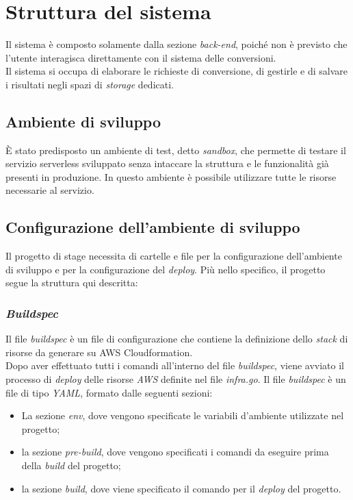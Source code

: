 \newpage
\section{Struttura del sistema}

Il sistema è composto solamente dalla sezione \emph{back-end}, poiché
non è previsto che l'utente interagisca direttamente con il sistema delle
conversioni. \\
Il sistema si occupa di elaborare le richieste di conversione, di gestirle e di
salvare i risultati negli spazi di \emph{storage} dedicati.

\subsection{Ambiente di sviluppo}

È stato predisposto un ambiente di test, detto \emph{sandbox}, che permette di
testare il servizio serverless sviluppato senza intaccare la struttura e le
funzionalità già presenti in produzione. In questo ambiente è possibile
utilizzare tutte le risorse necessarie al servizio.

\subsection{Configurazione dell'ambiente di sviluppo}

Il progetto di stage necessita di cartelle e file per la configurazione
dell'ambiente di sviluppo e per la configurazione del \emph{deploy}. Più nello
specifico, il progetto segue la struttura qui descritta:

\subsubsection{\emph{Buildspec}}

Il file \emph{buildspec} è un file di configurazione che contiene la definizione
dello \emph{stack} di risorse da generare su \glsfirstoccur\gls{AWS
      Cloudformation}. \\
Dopo aver effettuato tutti i comandi all'interno del file \emph{buildspec},
viene avviato il processo di \emph{deploy} delle risorse \emph{AWS} definite nel
file \emph{infra.go}. Il file \emph{buildspec} è un file di tipo \emph{YAML},
formato dalle seguenti sezioni:
\begin{itemize}
      \item La sezione \emph{env}, dove vengono specificate le variabili
            d'ambiente utilizzate nel progetto;
      \item la sezione \emph{pre-build}, dove vengono specificati i comandi da
            eseguire prima della \emph{build} del progetto;
      \item la sezione \emph{build}, dove viene specificato il comando per il
            \emph{deploy} del progetto.
\end{itemize}

